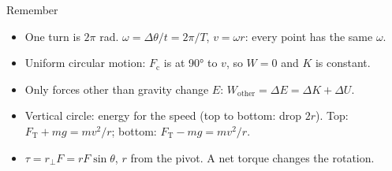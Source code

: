 \begin{summarybox}{Remember}
\begin{itemize}
  \item One turn is $2\pi$ rad. $\omega = \Delta\theta/t = 2\pi/T$, $v = \omega r$:
        every point has the same $\omega$.
  \item Uniform circular motion: $F_\mathrm{c}$ is at \ang{90} to $v$, so $W = 0$ and $K$ is constant.
  \item Only forces other than gravity change $E$: $W_\mathrm{other} = \Delta E = \Delta K + \Delta U$.
  \item Vertical circle: energy for the speed (top to bottom: drop $2r$). Top:
        $F_\mathrm{T} + mg = mv^2/r$; bottom: $F_\mathrm{T} - mg = mv^2/r$.
  \item $\tau = r_\perp F = rF\sin\theta$, $r$ from the pivot. A net torque changes the rotation.
\end{itemize}
\end{summarybox}

